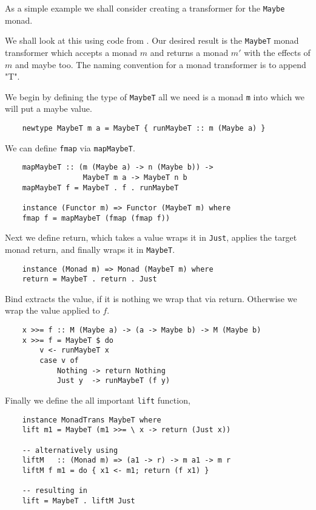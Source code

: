 \begin{example}
    As a simple example we shall consider
    creating a transformer for the \texttt{Maybe} monad.

    We shall look at this using code from \cite{haskellT}.
    Our desired result is the \texttt{MaybeT} monad transformer
    which accepts a monad $m$ and returns a monad $m\prime$
    with the effects of $m$ and maybe too.
    The naming convention for a monad transformer is to append "T".

    We begin by defining the type of \texttt{MaybeT}
    all we need is a monad \texttt{m} into which we will
    put a maybe value.
    \begin{verbatim}
    newtype MaybeT m a = MaybeT { runMaybeT :: m (Maybe a) }\end{verbatim}

    We can define \texttt{fmap} via \texttt{mapMaybeT}.
    \begin{verbatim}
    mapMaybeT :: (m (Maybe a) -> n (Maybe b)) ->
                  MaybeT m a -> MaybeT n b
    mapMaybeT f = MaybeT . f . runMaybeT

    instance (Functor m) => Functor (MaybeT m) where
    fmap f = mapMaybeT (fmap (fmap f))\end{verbatim}
    Next we define return,
    which takes a value wraps it in \texttt{Just},
    applies the target monad return,
    and finally wraps it in \texttt{MaybeT}.
    \begin{verbatim}
    instance (Monad m) => Monad (MaybeT m) where
    return = MaybeT . return . Just\end{verbatim}

    Bind extracts the value,
    if it is nothing we wrap that via return.
    Otherwise we wrap the value applied to $f$.
    \begin{verbatim}
    x >>= f :: M (Maybe a) -> (a -> Maybe b) -> M (Maybe b)
    x >>= f = MaybeT $ do
        v <- runMaybeT x
        case v of
            Nothing -> return Nothing
            Just y  -> runMaybeT (f y)\end{verbatim}
    Finally we define the all important \texttt{lift} function,
    \begin{verbatim}
    instance MonadTrans MaybeT where
    lift m1 = MaybeT (m1 >>= \ x -> return (Just x))

    -- alternatively using
    liftM   :: (Monad m) => (a1 -> r) -> m a1 -> m r
    liftM f m1 = do { x1 <- m1; return (f x1) }

    -- resulting in
    lift = MaybeT . liftM Just\end{verbatim}
\end{example}

